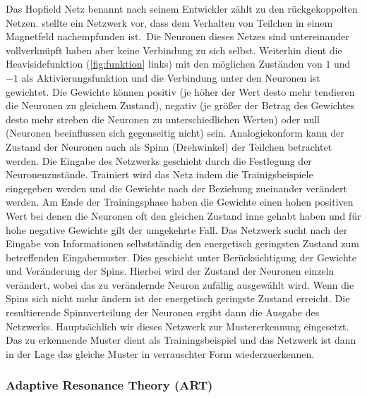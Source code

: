 Das Hopfield Netz benannt nach seinem Entwickler zählt zu den rückgekoppelten Netzen. \citet{HOPFIELD1986} stellte ein Netzwerk vor, dass dem Verhalten von Teilchen in einem Magnetfeld nachempfunden ist.\, Die Neuronen dieses Netzes sind untereinander vollverknüpft haben aber keine Verbindung zu sich selbst. Weiterhin dient die Heavisidefunktion (\autoref{fig:funktion} links) mit den möglichen Zuständen von $1$ und $-1$ als Aktivierungsfunktion und die Verbindung unter den Neuronen ist gewichtet. Die Gewichte können positiv (je höher der Wert desto mehr tendieren die Neuronen zu gleichem Zustand), negativ (je größer der Betrag des Gewichtes desto mehr streben die Neuronen zu unterschiedlichen Werten) oder null (Neuronen beeinflussen sich gegenseitig nicht) sein. Analogiekonform kann der Zustand der Neuronen auch als Spinn (Drehwinkel) der Teilchen betrachtet werden. Die Eingabe des Netzwerks geschieht durch die Festlegung der Neuronenzustände. Trainiert wird das Netz indem die Trainigsbeispiele eingegeben werden und die Gewichte nach der Beziehung zueinander verändert werden. Am Ende der Trainingsphase haben die Gewichte einen hohen positiven Wert bei denen die Neuronen oft den gleichen Zustand inne gehabt haben und für hohe negative Gewichte gilt der umgekehrte Fall. Das Netzwerk sucht nach der Eingabe von Informationen selbstständig den energetisch geringsten Zustand zum betreffenden Eingabemuster. Dies geschieht unter Berücksichtigung der Gewichte und Veränderung der Spins. Hierbei wird der Zustand der Neuronen einzeln verändert, wobei das zu verändernde Neuron zufällig ausgewählt wird. Wenn die Spins sich nicht mehr ändern ist der energetisch geringste Zustand erreicht. Die resultierende Spinnverteilung der Neuronen ergibt dann die Ausgabe des Netzwerks. Hauptsächlich wir dieses Netzwerk zur Mustererkennung eingesetzt. Das zu erkennende Muster dient als Trainingsbeispiel und das Netzwerk ist dann in der Lage das gleiche Muster in verrauschter Form wiederzuerkennen.


\subsubsection{Adaptive Resonance Theory (ART)}\\

